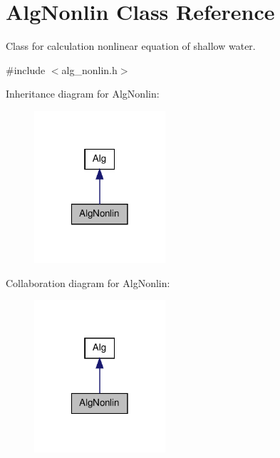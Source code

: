 \hypertarget{classAlgNonlin}{
\section{AlgNonlin Class Reference}
\label{classAlgNonlin}
}


Class for calculation nonlinear equation of shallow water.  




{\ttfamily \#include $<$alg\_\-nonlin.h$>$}



Inheritance diagram for AlgNonlin:
\nopagebreak
\begin{figure}[H]
\begin{center}
\leavevmode
\includegraphics[width=138pt]{classAlgNonlin__inherit__graph}
\end{center}
\end{figure}


Collaboration diagram for AlgNonlin:
\nopagebreak
\begin{figure}[H]
\begin{center}
\leavevmode
\includegraphics[width=138pt]{classAlgNonlin__coll__graph}
\end{center}
\end{figure}
